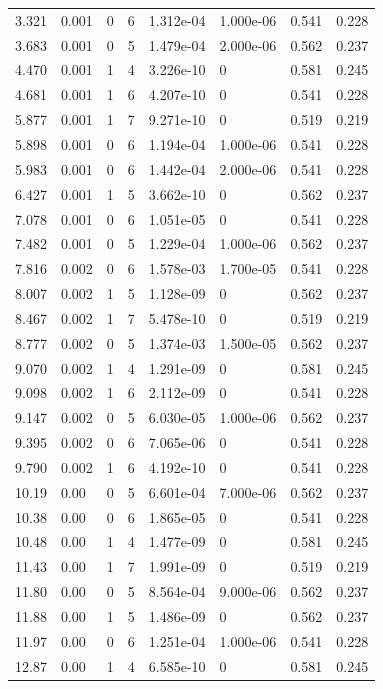 \documentclass[preview]{standalone}
\begin{document}
{{\begin{tabular}{L{1.2cm}C{1.2cm} C{0.3cm}C{0.5cm} C{1.4cm}C{1.4cm} C{1.4cm}C{1.4cm}}
  3.321  &  0.001  & 0     &  6 &  1.312e-04  & 1.000e-06  & 0.541 &  0.228   \\ 
  3.683  &  0.001  & 0     &  5 &  1.479e-04  & 2.000e-06  & 0.562 &  0.237   \\ 
  4.470  &  0.001  & 1     &  4 &  3.226e-10  & 0  & 0.581 &  0.245   \\ 
  4.681  &  0.001  & 1     &  6 &  4.207e-10  & 0  & 0.541 &  0.228   \\ 
  5.877  &  0.001  & 1     &  7 &  9.271e-10  & 0  & 0.519 &  0.219   \\ 
  5.898  &  0.001  & 0     &  6 &  1.194e-04  & 1.000e-06  & 0.541 &  0.228   \\ 
  5.983  &  0.001  & 0     &  6 &  1.442e-04  & 2.000e-06  & 0.541 &  0.228   \\ 
  6.427  &  0.001  & 1     &  5 &  3.662e-10  & 0  & 0.562 &  0.237   \\ 
  7.078  &  0.001  & 0     &  6 &  1.051e-05  & 0  & 0.541 &  0.228   \\ 
  7.482  &  0.001  & 0     &  5 &  1.229e-04  & 1.000e-06  & 0.562 &  0.237   \\ 
  7.816  &  0.002  & 0     &  6 &  1.578e-03  & 1.700e-05  & 0.541 &  0.228   \\ 
  8.007  &  0.002  & 1     &  5 &  1.128e-09  & 0  & 0.562 &  0.237   \\ 
  8.467  &  0.002  & 1     &  7 &  5.478e-10  & 0  & 0.519 &  0.219   \\ 
  8.777  &  0.002  & 0     &  5 &  1.374e-03  & 1.500e-05  & 0.562 &  0.237   \\ 
  9.070  &  0.002  & 1     &  4 &  1.291e-09  & 0  & 0.581 &  0.245   \\ 
  9.098  &  0.002  & 1     &  6 &  2.112e-09  & 0  & 0.541 &  0.228   \\ 
  9.147  &  0.002  & 0     &  5 &  6.030e-05  & 1.000e-06  & 0.562 &  0.237   \\ 
  9.395  &  0.002  & 0     &  6 &  7.065e-06  & 0  & 0.541 &  0.228   \\ 
  9.790  &  0.002  & 1     &  6 &  4.192e-10  & 0  & 0.541 &  0.228   \\ 
  10.19  &  0.00  & 0     &  5 &  6.601e-04  & 7.000e-06  & 0.562 &  0.237   \\ 
  10.38  &  0.00  & 0     &  6 &  1.865e-05  & 0  & 0.541 &  0.228   \\ 
  10.48  &  0.00  & 1     &  4 &  1.477e-09  & 0  & 0.581 &  0.245   \\ 
  11.43  &  0.00  & 1     &  7 &  1.991e-09  & 0  & 0.519 &  0.219   \\ 
  11.80  &  0.00  & 0     &  5 &  8.564e-04  & 9.000e-06  & 0.562 &  0.237   \\ 
  11.88  &  0.00  & 1     &  5 &  1.486e-09  & 0  & 0.562 &  0.237   \\ 
  11.97  &  0.00  & 0     &  6 &  1.251e-04  & 1.000e-06  & 0.541 &  0.228   \\ 
  12.87  &  0.00  & 1     &  4 &  6.585e-10  & 0  & 0.581 &  0.245   \\ 
\hline 
\end{tabular} 

}}
\end{document}
